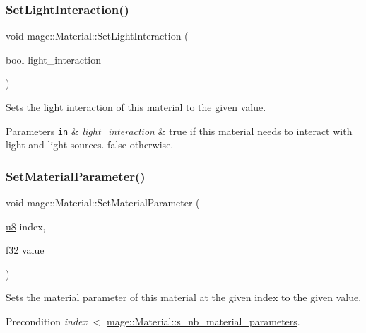 \subsubsection{\texorpdfstring{Set\+Light\+Interaction()}{SetLightInteraction()}}
{\footnotesize\ttfamily void mage\+::\+Material\+::\+Set\+Light\+Interaction (\begin{DoxyParamCaption}\item[{bool}]{light\+\_\+interaction }\end{DoxyParamCaption})\hspace{0.3cm}{\ttfamily [noexcept]}}

Sets the light interaction of this material to the given value.


\begin{DoxyParams}[1]{Parameters}
\mbox{\tt in}  & {\em light\+\_\+interaction} & {\ttfamily true} if this material needs to interact with light and light sources. {\ttfamily false} otherwise. \\
\hline
\end{DoxyParams}
\hypertarget{structmage_1_1_material_aaff5f2ae7167a28e15c5188970a05550}{}\label{structmage_1_1_material_aaff5f2ae7167a28e15c5188970a05550} 
\subsubsection{\texorpdfstring{Set\+Material\+Parameter()}{SetMaterialParameter()}}
{\footnotesize\ttfamily void mage\+::\+Material\+::\+Set\+Material\+Parameter (\begin{DoxyParamCaption}\item[{\hyperlink{namespacemage_a5a362e2d56fc439362a80516ecae7828}{u8}}]{index,  }\item[{\hyperlink{namespacemage_a6a44ad388483959dc4dff9f2aef91431}{f32}}]{value }\end{DoxyParamCaption})\hspace{0.3cm}{\ttfamily [noexcept]}}

Sets the material parameter of this material at the given index to the given value.

\begin{DoxyPrecond}{Precondition}
{\itshape index} $<$ \hyperlink{structmage_1_1_material_a06d6d7b7243ea8acce9445b501816d78}{mage\+::\+Material\+::s\+\_\+nb\+\_\+material\+\_\+parameters}. 
\end{DoxyPrecond}

